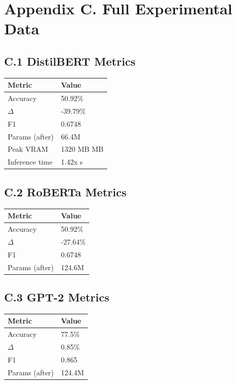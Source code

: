 
\section{Appendix C. Full Experimental Data}

\subsection{C.1 DistilBERT Metrics}

\begin{table}[H]
\centering
\small
\begin{tabular}{ll}
\toprule
\textbf{Metric} & \textbf{Value} \\
\midrule
Accuracy & 50.92\% \\
$\Delta$ & -39.79\% \\
F1 & 0.6748 \\
Params (after) & 66.4M \\
Peak VRAM & 1320 MB MB \\
Inference time & 1.42x s \\
\bottomrule
\end{tabular}
\end{table}

\subsection{C.2 RoBERTa Metrics}

\begin{table}[H]
\centering
\small
\begin{tabular}{ll}
\toprule
\textbf{Metric} & \textbf{Value} \\
\midrule
Accuracy & 50.92\% \\
$\Delta$ & -27.64\% \\
F1 & 0.6748 \\
Params (after) & 124.6M \\
\bottomrule
\end{tabular}
\end{table}

\subsection{C.3 GPT-2 Metrics}

\begin{table}[H]
\centering
\small
\begin{tabular}{ll}
\toprule
\textbf{Metric} & \textbf{Value} \\
\midrule
Accuracy & 77.5\% \\
$\Delta$ & 0.85\% \\
F1 & 0.865 \\
Params (after) & 124.4M \\
\bottomrule
\end{tabular}
\end{table}

